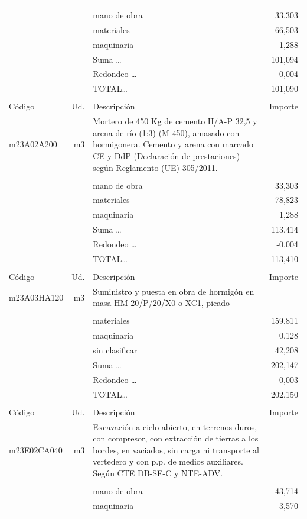 \documentclass{book}%
\begin{document}
\begin{supertabular}{l r p{60mm} r}
&&&\\%
&&mano de obra&    33,303\\%
&&materiales&    66,503\\%
&&maquinaria&     1,288\\%
&&Suma \ldots&   101,094\\%
&&Redondeo \ldots&    {-}0,004\\%
%
&&TOTAL\ldots&   101,090\\%
&&&\\%
Código&Ud.&Descripción&Importe\\%
\hline%
m23A02A200&m3&Mortero de 450 Kg de cemento II/A{-}P 32,5 y arena de río (1:3) (M{-}450), amasado con hormigonera. Cemento y arena con marcado CE y DdP (Declaración de prestaciones) según Reglamento (UE) 305/2011.&\\%
&&&\\%
&&mano de obra&    33,303\\%
&&materiales&    78,823\\%
&&maquinaria&     1,288\\%
&&Suma \ldots&   113,414\\%
&&Redondeo \ldots&    {-}0,004\\%
%
&&TOTAL\ldots&   113,410\\%
&&&\\%
Código&Ud.&Descripción&Importe\\%
\hline%
m23A03HA120&m3&Suministro y puesta en obra de hormigón en masa HM{-}20/P/20/X0 o XC1, picado&\\%
&&&\\%
&&materiales&   159,811\\%
&&maquinaria&     0,128\\%
&&sin clasificar&    42,208\\%
&&Suma \ldots&   202,147\\%
&&Redondeo \ldots&     0,003\\%
%
&&TOTAL\ldots&   202,150\\%
&&&\\%
Código&Ud.&Descripción&Importe\\%
\hline%
m23E02CA040&m3&Excavación a cielo abierto, en terrenos duros, con compresor, con extracción de tierras a los bordes, en vaciados, sin carga ni transporte al vertedero y con p.p. de medios auxiliares. Según CTE DB{-}SE{-}C y NTE{-}ADV.&\\%
&&&\\%
&&mano de obra&    43,714\\%
&&maquinaria&     3,570\\%

\end{supertabular}
\end{document}
